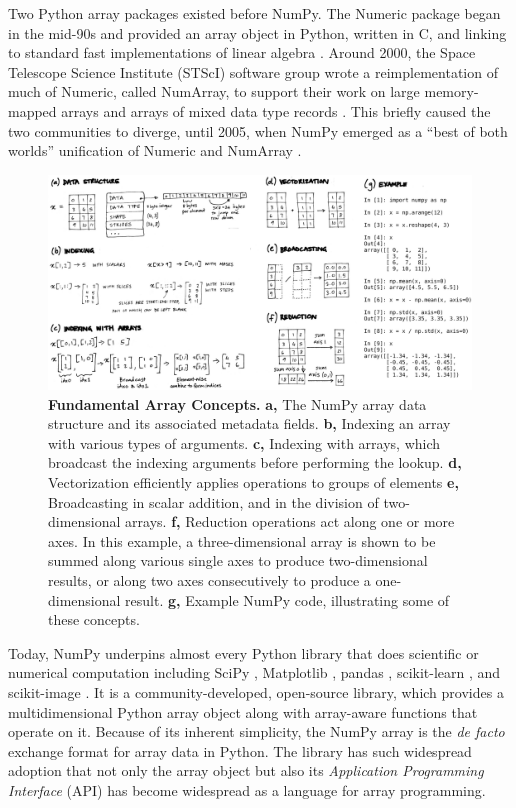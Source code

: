 Two Python array packages existed before NumPy.
The Numeric package began in the mid-90s and provided an array object in
Python, written in C, and linking to standard fast implementations of linear
algebra \cite{Numericmanual}.
Around 2000, the Space Telescope Science Institute (STScI) software group wrote
a reimplementation of much of Numeric, called NumArray, to support their work
on large memory-mapped arrays and arrays of mixed data type
records \cite{greenfield2003numarray}.
This briefly caused the two communities to diverge, until
2005, when NumPy emerged as a ``best of both worlds'' unification of Numeric
and NumArray \cite{oliphant2006guide}.

\begin{figure}[h]
  \centering
  \includegraphics[width=\textwidth]{static/sketches/array-concepts}   
  \caption{\textbf{Fundamental Array Concepts.}
    \textbf{a,} The NumPy array data structure and its associated metadata fields.
    \textbf{b,} Indexing an array with various types of arguments.
    \textbf{c,} Indexing with arrays, which broadcast the indexing arguments before performing the lookup.
    \textbf{d,} Vectorization efficiently applies operations to groups of elements
    \textbf{e,} Broadcasting in scalar addition, and in the division of two-dimensional arrays.
    \textbf{f,} Reduction operations act along one or more axes. In this
    example, a three-dimensional array is shown to be summed along various single
    axes to produce two-dimensional results, or along two axes consecutively to
    produce a one-dimensional result.
    \textbf{g,} Example NumPy code, illustrating some of these concepts.
   }
  \label{fig:array-concepts}
\end{figure}

Today, NumPy underpins almost every Python library that does scientific or
numerical computation including SciPy \cite{virtanen2019scipy},
Matplotlib \cite{hunter2007matplotlib}, pandas \cite{mckinney-proc-scipy-2010},
scikit-learn \cite{pedregosa2011scikit}, and
scikit-image \cite{vanderwalt2014scikit}.
It is a community-developed, open-source library, which provides a
multidimensional Python array object along with array-aware functions
that operate on it.
Because of its inherent simplicity, the NumPy array is
the \emph{de facto} exchange format for array data in Python.
The library has such widespread adoption that not only the array object but also its
\emph{Application Programming Interface} (API) has become widespread as
a language for array programming.

